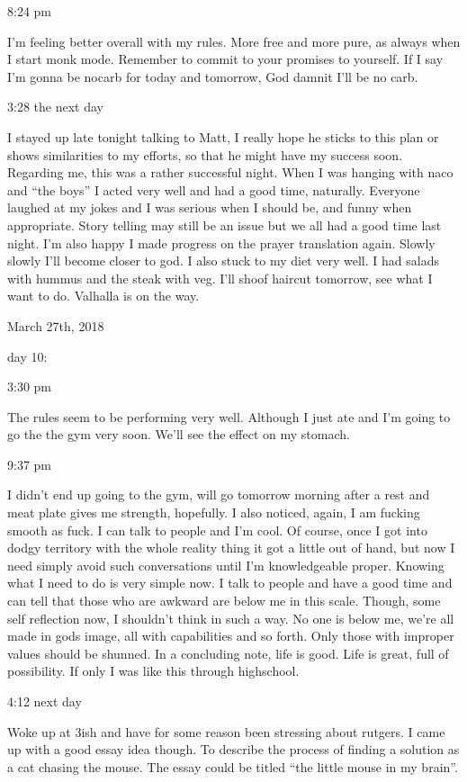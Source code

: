 8:24 pm

I'm feeling better overall with my rules. More free and more pure, as
always when I start monk mode. Remember to commit to your promises to
yourself. If I say I'm gonna be nocarb for today and tomorrow, God
damnit I'll be no carb.

3:28 the next day

I stayed up late tonight talking to Matt, I really hope he sticks to
this plan or shows similarities to my efforts, so that he might have my
success soon. Regarding me, this was a rather successful night. When I
was hanging with naco and ``the boys'' I acted very well and had a good
time, naturally. Everyone laughed at my jokes and I was serious when I
should be, and funny when appropriate. Story telling may still be an
issue but we all had a good time last night. I'm also happy I made
progress on the prayer translation again. Slowly slowly I'll become
closer to god. I also stuck to my diet very well. I had salads with
hummus and the steak with veg. I'll shoof haircut tomorrow, see what I
want to do. Valhalla is on the way.

\bigskip
\bigskip
March 27th, 2018

day 10:

3:30 pm

The rules seem to be performing very well. Although I just ate and I'm
going to go the the gym very soon. We'll see the effect on my stomach.

9:37 pm

I didn't end up going to the gym, will go tomorrow morning after a rest
and meat plate gives me strength, hopefully. I also noticed, again, I am
fucking smooth as fuck. I can talk to people and I'm cool. Of course,
once I got into dodgy territory with the whole reality thing it got a
little out of hand, but now I need simply avoid such conversations until
I'm knowledgeable proper. Knowing what I need to do is very simple now.
I talk to people and have a good time and can tell that those who are
awkward are below me in this scale. Though, some self reflection now, I
shouldn't think in such a way. No one is below me, we're all made in
gods image, all with capabilities and so forth. Only those with improper
values should be shunned. In a concluding note, life is good. Life is
great, full of possibility. If only I was like this through highschool.

4:12 next day

Woke up at 3ish and have for some reason been stressing about rutgers. I
came up with a good essay idea though. To describe the process of
finding a solution as a cat chasing the mouse. The essay could be titled
``the little mouse in my brain''.

